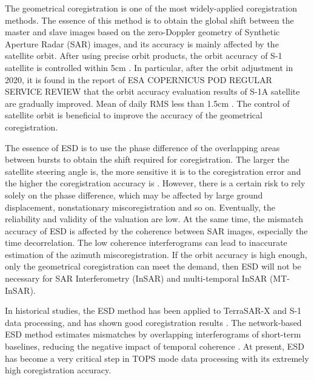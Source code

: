 \documentclass[a4paper,fleqn]{cas-sc}
\begin{document}
The geometrical coregistration is one of the most widely-applied coregistration methods. The essence of this method is to obtain the global shift between the master and slave images based on the zero-Doppler geometry of Synthetic Aperture Radar (SAR) images, and its accuracy is mainly affected by the satellite orbit. After using precise orbit products, the orbit accuracy of S-1 satellite is controlled within 5cm \cite{Interferometric_Processing_of_Sentinel-1_TOPS_Data, A_Study_of_Sentinel-1_TOPS_Mode_Co-registration}. In particular, after the orbit adjustment in 2020, it is found in the report of ESA COPERNICUS POD REGULAR SERVICE REVIEW that the orbit accuracy evaluation results of S-1A satellite are gradually improved. Mean of daily RMS less than 1.5cm \cite{copernicus_review_2020.10-2020.12, copernicus_review_2021.01-2021.12, copernicus_review_2022.01-2022.12}. The control of satellite orbit is beneficial to improve the accuracy of the geometrical coregistration. \par

The essence of ESD is to use the phase difference of the overlapping areas between bursts to obtain the shift required for coregistration. The larger the satellite steering angle is, the more sensitive it is to the coregistration error and the higher the coregistration accuracy is \cite{TOPS_Interferometry_With_TerraSAR-X}. However, there is a certain risk to rely solely on the phase difference, which may be affected by large ground displacement, nonstationary miscoregistration and so on. Eventually, the reliability and validity of the valuation are low. At the same time, the mismatch accuracy of ESD is affected by the coherence between SAR images, especially the time decorrelation. The low coherence interferograms can lead to inaccurate estimation of the azimuth miscoregistration. If the orbit accuracy is high enough, only the geometrical coregistration can meet the demand, then ESD will not be necessary for SAR Interferometry (InSAR) and multi-temporal InSAR (MT-InSAR). \par

In historical studies, the ESD method has been applied to TerraSAR-X and S-1 data processing, and has shown good coregistration results \cite{Interferometry_with_TOPS:_coregistration_and_azimuth_shifts, Interferometric_Processing_of_Sentinel-1_TOPS_Data}. The network-based ESD method estimates mismatches by overlapping interferograms of short-term baselines, reducing the negative impact of temporal coherence \cite{A_Network-Based_Enhanced_Spectral_Diversity_Approach_for_TOPS_Time-Series_Analysis}. At present, ESD has become a very critical step in TOPS mode data processing with its extremely high coregistration accuracy. \par
\end{document}
